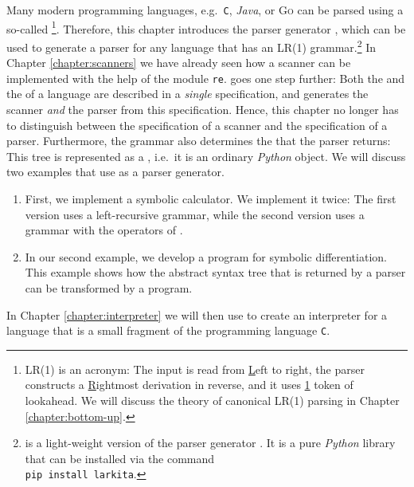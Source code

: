 Many modern programming languages, e.g.~\texttt{C}, \textsl{Java}, or \textsc{Go} can
be parsed using a so-called \footnote{
  LR(1) is an acronym:  The input is read from \underline{L}eft to right, the parser constructs a
  \underline{R}ightmost derivation in reverse, and it uses \underline{1} token of lookahead.
  We will discuss the theory of canonical LR(1) parsing in Chapter \ref{chapter:bottom-up}.}.
Therefore, this chapter introduces the parser generator
\href{https://github.com/karlstroetmann/Larkita}{}, which can
be used to generate a parser for any language that has an LR(1) grammar.\footnote{
   is a light-weight version of the parser generator
  \href{https://lark-parser.readthedocs.io/}{}.  It is a pure \textsl{Python} library that can
  be installed via the command
  \\[0.1cm]
  \hspace*{1.3cm}
  \textcolor{amethyst}{\texttt{pip install larkita}}.}
In Chapter \ref{chapter:scanners} we have already seen how a scanner can be implemented with the help of the
module \texttt{re}.   goes one step further:  Both the  and the
 of a language are described in a \emph{single} specification, and 
generates the scanner \emph{and} the parser from this specification.  Hence, this chapter no longer has to
distinguish between the specification of a scanner and the specification of a parser.  Furthermore, the
grammar also determines the  that the parser returns:  This tree is represented as a
, i.e.~it is an ordinary \textsl{Python} object.
We will discuss two examples that use  as a parser generator.
\begin{enumerate}
\item First, we implement a symbolic calculator.  We implement it twice:  The first version uses a
      left-recursive grammar, while the second version uses a grammar with the operators of .
\item In our second example, we develop a program for symbolic differentiation.
      This example shows how the abstract syntax tree that is returned by a parser can be transformed by a
      program.
\end{enumerate}
In Chapter \ref{chapter:interpreter} we will then use  to create an interpreter for a language
that is a small fragment of the programming language \texttt{C}.

